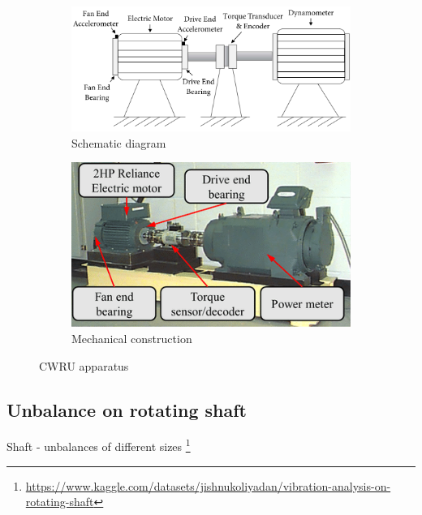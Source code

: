\cite{jamil_feature-based_2021}

\begin{figure}[h]
\centering
\begin{subfigure}[b]{0.48\textwidth}
	\includegraphics[width=\textwidth]{assets/cwru-test-stand-2.png}
	\caption{Schematic diagram \cite{song_bearing_2022}}
\end{subfigure}
\hfill
\begin{subfigure}[b]{0.48\textwidth}
	\includegraphics[width=\textwidth]{assets/cwru-test-stand.png}
	\caption{Mechanical construction \cite{yuhong_new_2021}}
\end{subfigure}
\caption{CWRU apparatus}
\label{fig:cwru-simulator}
\end{figure}



\subsection{Unbalance on rotating shaft}
Shaft -  unbalances of different sizes \footnote{\url{https://www.kaggle.com/datasets/jishnukoliyadan/vibration-analysis-on-rotating-shaft}}

